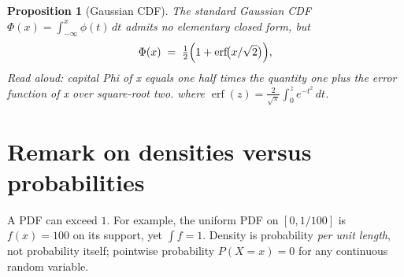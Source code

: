 \documentclass[11pt]{article}
\newtheorem{proposition}{Proposition}
\begin{document}
\begin{proposition}[Gaussian CDF]
The standard Gaussian CDF $\Phi(x) = \int_{-\infty}^{x} \phi(t)\,dt$ admits no elementary closed form, but
\[
    \Phi(x) \;=\; \tfrac{1}{2}\Bigl(1 + \operatorname{erf}\!\bigl(x/\sqrt{2}\bigr)\Bigr),
\]
\emph{Read aloud:} capital Phi of x equals one half times the quantity one plus the error function of x over square-root two.
where $\operatorname{erf}(z) = \frac{2}{\sqrt{\pi}}\int_0^z e^{-t^2}\,dt$.
\end{proposition}

\section{Remark on densities versus probabilities}

A PDF can exceed $1$. For example, the uniform PDF on $[0, 1/100]$ is $f(x) = 100$ on its support, yet $\int f = 1$. Density is probability \emph{per unit length}, not probability itself; pointwise probability $P(X = x) = 0$ for any continuous random variable.
\end{document}
